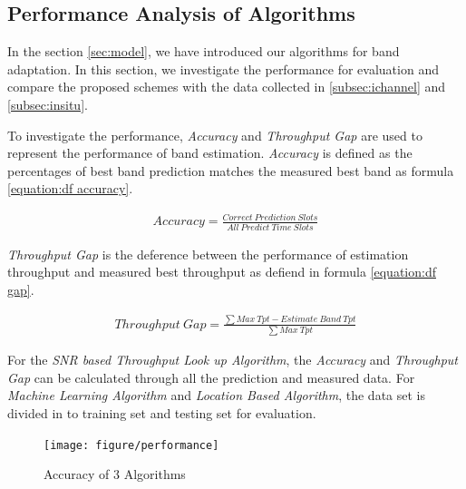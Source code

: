 \subsection{Performance Analysis of Algorithms}
\label{subsec:data process}

In the section \ref{sec:model}, we have introduced our algorithms for band adaptation. 
In this section, we investigate the performance for evaluation and compare the proposed schemes with the data collected in
\ref{subsec:ichannel} and \ref{subsec:insitu}.

To investigate the performance, \emph{Accuracy} and \emph{Throughput Gap} are used to represent the performance of band estimation.
\emph{Accuracy} is defined as the percentages of best band prediction matches the measured best band as formula \ref{equation:df accuracy}.


\begin{align}
\label{equation:df accuracy}
Accuracy = \frac{Correct\ Prediction\ Slots}{All\ Predict\ Time\ Slots}
\end{align}



\emph{Throughput Gap} is the deference between the performance of estimation throughput and measured best throughput as defiend in formula \ref{equation:df gap}.

\begin{align}
\label{equation:df gap}
Throughput\ Gap = \frac{\sum{Max\ Tpt- Estimate\ Band\ Tpt}}{\sum{Max\ Tpt}}
\end{align}


For the \emph{SNR based Throughput Look up Algorithm}, the \emph{Accuracy} and \emph{Throughput Gap} can be calculated through all the prediction and measured data.
For \emph{Machine Learning Algorithm} and \emph{Location Based Algorithm}, the data set is divided in to training set and testing set for evaluation.



\begin{figure}
\centering
\texttt{[image: figure/performance]}
\caption{Accuracy of 3 Algorithms}
\label{fig:performance}
\end{figure}


